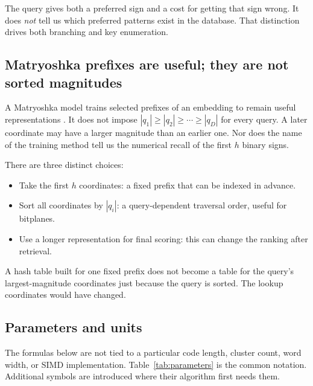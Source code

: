 The query gives both a preferred sign and a cost for getting that sign wrong. It does
\emph{not} tell us which preferred patterns exist in the database. That distinction drives
both branching and key enumeration.

\subsection{Matryoshka prefixes are useful; they are not sorted magnitudes}
A Matryoshka model trains selected prefixes of an embedding to remain useful representations
\cite{mrl}. It does not impose
$|q_1|\geq |q_2|\geq\cdots\geq |q_D|$ for every query. A later coordinate may have a larger
magnitude than an earlier one. Nor does the name of the training method tell us the numerical
recall of the first $h$ binary signs.

There are three distinct choices:
\begin{itemize}
\item Take the first $h$ coordinates: a fixed prefix that can be indexed in advance.
\item Sort all coordinates by $|q_i|$: a query-dependent traversal order, useful for bitplanes.
\item Use a longer representation for final scoring: this can change the ranking after retrieval.
\end{itemize}
A hash table built for one fixed prefix does not become a table for the query's largest-magnitude
coordinates just because the query is sorted. The lookup coordinates would have changed.

\subsection{Parameters and units}
The formulas below are not tied to a particular code length, cluster count, word width, or
SIMD implementation. Table~\ref{tab:parameters} is the common notation. Additional symbols are
introduced where their algorithm first needs them.

